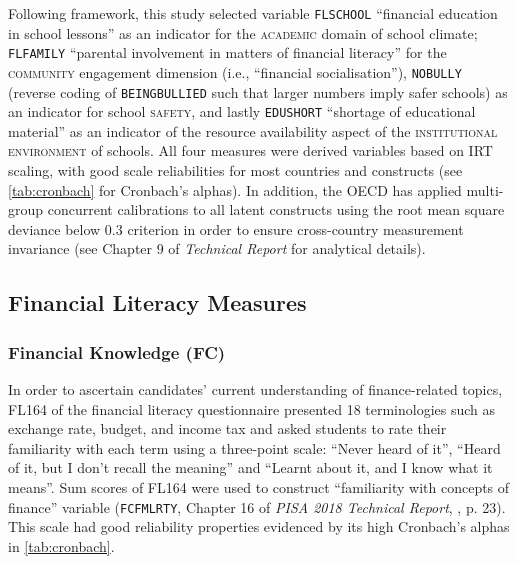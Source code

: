 \documentclass[a4paper,11pt,UKenglish,twoside,openright]{report}\usepackage[]{graphicx}\usepackage[]{color}
\begin{document}
Following  framework, this study selected variable \texttt{FLSCHOOL} ``financial education in school lessons'' as an indicator for the \textsc{academic} domain of school climate; \texttt{FLFAMILY} ``parental involvement in matters of financial literacy'' for the \textsc{community} engagement dimension (i.e., ``financial socialisation''), \texttt{NOBULLY} (reverse coding of \texttt{BEINGBULLIED} such that larger numbers imply safer schools) as an indicator for school \textsc{safety}, and lastly \texttt{EDUSHORT} ``shortage of educational material'' as an indicator of the resource availability aspect of the \textsc{institutional environment} of schools. All four measures were derived variables based on IRT scaling, with good scale reliabilities for most countries and constructs (see \cref{tab:cronbach} for Cronbach's alphas). In addition, the OECD has applied multi-group concurrent calibrations to all latent constructs using the root mean square deviance below $0.3$ criterion \parencite[for a technical discussion on RMSD, see][p. 244]{buchholz:2019} in order to ensure cross-country measurement invariance (see Chapter 9 of \textit{Technical Report} \parencite[][pp. 14--15]{PISAtech} for analytical details).



\subsection{Financial Literacy Measures}

\subsubsection{Financial Knowledge (FC)}

In order to ascertain candidates' current understanding of finance-related topics, \textsf{FL164} of the financial literacy questionnaire presented 18 terminologies such as exchange rate, budget, and income tax and asked students to rate their familiarity with each term using a three-point scale: ``Never heard of it'', ``Heard of it, but I don't recall the meaning'' and ``Learnt about it, and I know what it means''. Sum scores of \textsf{FL164} were used to construct ``familiarity with concepts of finance'' variable (\texttt{FCFMLRTY}, Chapter 16 of \textit{PISA 2018 Technical Report}, \textcite{PISAtech}, p. 23). This scale had good reliability properties evidenced by its high Cronbach's alphas in \cref{tab:cronbach}.
\end{document}
